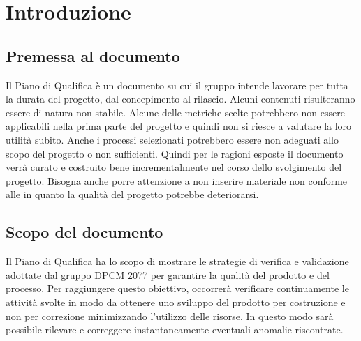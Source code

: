 \section{Introduzione}

\subsection{Premessa al documento}
Il Piano di Qualifica è un documento su cui il gruppo intende lavorare per tutta la durata del progetto, dal concepimento al rilascio.
Alcuni contenuti risulteranno essere di natura non stabile. Alcune delle metriche scelte potrebbero non essere applicabili nella prima parte del progetto e quindi non si riesce a valutare la loro utilità subito.
Anche i processi selezionati potrebbero essere non adeguati allo scopo del progetto o non sufficienti. Quindi per le ragioni esposte il documento verrà curato e costruito bene incrementalmente nel corso 
dello svolgimento del progetto. Bisogna anche porre attenzione a non inserire materiale non conforme alle  in quanto la qualità del progetto potrebbe deteriorarsi.

\subsection{Scopo del documento}
Il Piano di Qualifica ha lo scopo di mostrare le strategie di verifica e validazione adottate dal gruppo DPCM 2077 per garantire la qualità del prodotto e del processo. 
Per raggiungere questo obiettivo, occorrerà verificare continuamente le attività svolte in modo da ottenere uno sviluppo del prodotto per costruzione e non per correzione minimizzando l’utilizzo delle risorse.
In questo modo sarà possibile rilevare e correggere instantaneamente eventuali anomalie riscontrate.

